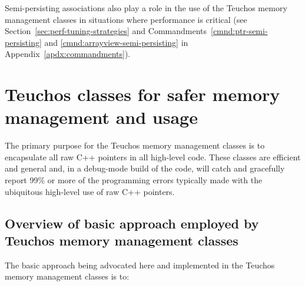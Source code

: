 \documentclass[pdf,ps2pdf,11pt]{SANDreport}
\begin{document}
Semi-persisting associations also play a role in the use of the
Teuchos memory management classes in situations where performance is
critical (see Section~\ref{sec:perf-tuning-strategies} and
Commandments~\ref{cmnd:ptr-semi-persisting} and
{}\ref{cmnd:arrayview-semi-persisting} in
Appendix~\ref{apdx:commandments}).


%
{}\section{Teuchos classes for safer memory management and usage}
\label{sec:teuchos-mem-mng-classes}
%

The primary purpose for the Teuchos memory management classes is to
encapsulate all raw C++ pointers in all high-level code.  These
classes are efficient and general and, in a debug-mode build of the
code, will catch and gracefully report 99\% or more of the programming
errors typically made with the ubiquitous high-level use of raw C++
pointers.


%
{}\subsection{Overview of basic approach employed by Teuchos
memory management classes}
\label{sec:overview_of_basic_approach}
%

The basic approach being advocated here and implemented in the Teuchos
memory management classes is to:
\end{document}
